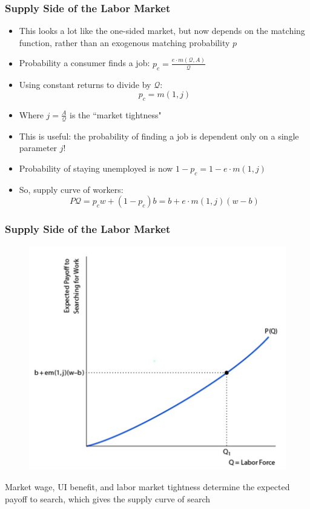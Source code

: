 \documentclass{beamer}
\begin{document}
\begin{frame}
\frametitle[alignment=center]{Supply Side of the Labor Market}
\begin{itemize}
\item This looks a lot like the one-sided market, but now depends on the matching function, rather than an exogenous matching probability $p$
\bigskip
\item Probability a consumer finds a job: $p_c=\frac{e\cdot m(\mathcal{Q},A)}{\mathcal{Q}}$
\bigskip
\item Using constant returns to divide by $\mathcal{Q}$:
$$p_c=m(1,j)$$
\item Where $j=\frac{A}{\mathcal{Q}}$ is the ``market tightness"
\bigskip
\item This is useful:  the probability of finding a job is dependent only on a single parameter $j$!
\bigskip
\item Probability of staying unemployed is now $1-p_c=1-e\cdot m(1,j)$
\bigskip
\item So, supply curve of workers:
$$P\mathcal{Q}=p_cw+(1-p_c)b=b+e\cdot m(1,j)(w-b)$$
\end{itemize}
\end{frame}
 
\begin{frame}
\frametitle[alignment=center]{Supply Side of the Labor Market}
\begin{figure}
\centering
\includegraphics[scale=0.5]{Figures/W_Fig_6pt18.png}
\end{figure}
Market wage, UI benefit, and labor market tightness determine the expected payoff to search, which gives the supply curve of search
\end{frame}
\end{document}
